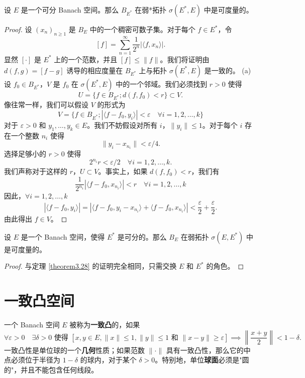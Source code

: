 \begin{theorem}\label{theorem3.28}
设 $E$ 是一个可分 Banach 空间。那么 $B_{E^*}$ 在弱*拓扑 $\sigma(E^*, E)$ 中是可度量的。
\end{theorem}
\begin{proof}
设 $(x_n)_{n\ge 1}$ 是 $B_E$ 中的一个稠密可数子集。对于每个 $f \in E^*$，令
\[ [f] = \sum_{n=1}^\infty \frac{1}{2^n} |\langle f, x_n \rangle|. \]
显然 $[ \cdot ]$ 是 $E^*$ 上的一个范数，并且 $[f] \le \|f\|$。我们将证明由 $d(f, g) = [f-g]$ 诱导的相应度量在 $B_{E^*}$ 上与拓扑 $\sigma(E^*, E)$ 是一致的。
(a) 设 $f_0 \in B_{E^*}$，$V$ 是 $f_0$ 在 $\sigma(E^*, E)$ 中的一个邻域。我们必须找到 $r>0$ 使得
\[ U = \{f \in B_{E^*}; d(f, f_0) < r\} \subset V. \]
像往常一样，我们可以假设 $V$ 的形式为
\[ V = \{f \in B_{E^*}; |\langle f-f_0, y_i \rangle| < \varepsilon \quad \forall i=1, 2, \dots, k\} \]
对于 $\varepsilon>0$ 和 $y_1, \dots, y_k \in E$。我们不妨假设对所有 $i$，$\|y_i\| \le 1$。对于每个 $i$ 存在一个整数 $n_i$ 使得
\[ \|y_i - x_{n_i}\| < \varepsilon/4. \]
选择足够小的 $r > 0$ 使得
\[ 2^{n_i} r < \varepsilon/2 \quad \forall i=1, 2, \dots, k. \]
我们声称对于这样的 $r$，$U \subset V$。事实上，如果 $d(f, f_0) < r$，我们有
\[ \frac{1}{2^{n_i}} |\langle f-f_0, x_{n_i} \rangle| < r \quad \forall i=1, 2, \dots, k \]
因此，$\forall i=1, 2, \dots, k$
\[ |\langle f-f_0, y_i \rangle| = |\langle f-f_0, y_i-x_{n_i} \rangle + \langle f-f_0, x_{n_i} \rangle| < \frac{\varepsilon}{2} + \frac{\varepsilon}{2}. \]
由此得出 $f \in V$。
\end{proof}
\begin{theorem}\label{theorem3.29}
设 $E$ 是一个 Banach 空间，使得 $E^*$ 是可分的。那么 $B_E$ 在弱拓扑 $\sigma(E, E^*)$ 中是可度量的。
\end{theorem}
\begin{proof}
与定理 \ref{theorem3.28} 的证明完全相同，只需交换 $E$ 和 $E^*$ 的角色。
\end{proof}

\section{一致凸空间}
\begin{definition}
一个 Banach 空间 $E$ 被称为\textbf{一致凸}的，如果
\[ \forall \varepsilon > 0 \quad \exists \delta > 0 \text{ 使得 } [x, y \in E, \|x\| \le 1, \|y\| \le 1 \text{ 和 } \|x-y\| \ge \varepsilon] \implies \left\| \frac{x+y}{2} \right\| < 1-\delta. \]
一致凸性是单位球的一个\textbf{几何}性质；如果范数 $\| \cdot \|$ 具有一致凸性，那么它的中点必须位于半径为 $1-\delta$ 的球内，对于某个 $\delta > 0$。特别地，单位\textbf{球面}必须是"圆的"，并且不能包含任何线段。
\end{definition}

